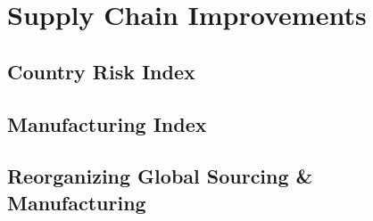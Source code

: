 \section{Supply Chain Improvements}

\subsection{Country Risk Index}

\subsection{Manufacturing Index}

\subsection{Reorganizing Global Sourcing \& Manufacturing}